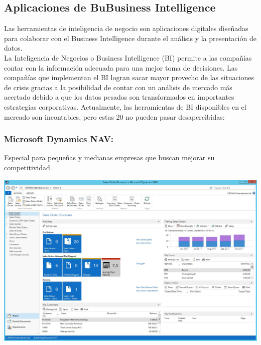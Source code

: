 \subsection{Aplicaciones de BuBusiness Intelligence } 
\item{Las herramientas de inteligencia de negocio son aplicaciones digitales diseñadas para colaborar con el Business Intelligence durante el análisis y la presentación de datos.\\
La Inteligencia de Negocios o Business Intelligence (BI) permite a las compañías contar con la información adecuada para una mejor toma de decisiones.  Las compañías que implementan el BI logran sacar mayor provecho de las situaciones de crisis gracias a la posibilidad de contar con un análisis de mercado más acertado debido a que los datos pesados son transformados en importantes estrategias corporativas.
Actualmente, las herramientas de BI disponibles en el mercado son incontables, pero estas 20 no pueden pasar desapercibidas:}
\subsubsection{Microsoft Dynamics NAV: }\label{sec:nada2} 
Especial para pequeñas y medianas empresas que buscan mejorar su competitividad.
	\begin{center}
	\includegraphics[width=15cm]{./Imagenes/BIimagen1}
	\end{center}
	
\newpage
